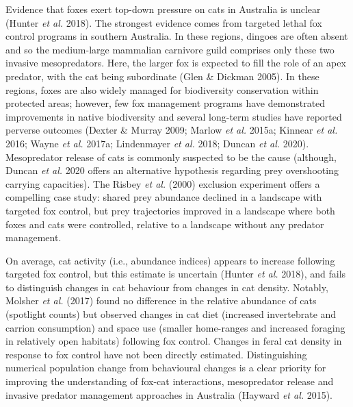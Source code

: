 \documentclass[11pt,a4paper,titlepage,twoside,openright]{style/unimelbthesis}
\begin{document}
\begin{mainmatter}
Evidence that foxes exert top-down pressure on cats in Australia is unclear (Hunter \emph{et al.} 2018). The strongest evidence comes from targeted lethal fox control programs in southern Australia. In these regions, dingoes are often absent and so the medium-large mammalian carnivore guild comprises only these two invasive mesopredators. Here, the larger fox is expected to fill the role of an apex predator, with the cat being subordinate (Glen \& Dickman 2005). In these regions, foxes are also widely managed for biodiversity conservation within protected areas; however, few fox management programs have demonstrated improvements in native biodiversity and several long-term studies have reported perverse outcomes (Dexter \& Murray 2009; Marlow \emph{et al.} 2015a; Kinnear \emph{et al.} 2016; Wayne \emph{et al.} 2017a; Lindenmayer \emph{et al.} 2018; Duncan \emph{et al.} 2020). Mesopredator release of cats is commonly suspected to be the cause (although, Duncan \emph{et al.} 2020 offers an alternative hypothesis regarding prey overshooting carrying capacities). The Risbey \emph{et al.} (2000) exclusion experiment offers a compelling case study: shared prey abundance declined in a landscape with targeted fox control, but prey trajectories improved in a landscape where both foxes and cats were controlled, relative to a landscape without any predator management.

On average, cat activity (i.e., abundance indices) appears to increase following targeted fox control, but this estimate is uncertain (Hunter \emph{et al.} 2018), and fails to distinguish changes in cat behaviour from changes in cat density. Notably, Molsher \emph{et al.} (2017) found no difference in the relative abundance of cats (spotlight counts) but observed changes in cat diet (increased invertebrate and carrion consumption) and space use (smaller home-ranges and increased foraging in relatively open habitats) following fox control. Changes in feral cat density in response to fox control have not been directly estimated. Distinguishing numerical population change from behavioural changes is a clear priority for improving the understanding of fox-cat interactions, mesopredator release and invasive predator management approaches in Australia (Hayward \emph{et al.} 2015).


\end{mainmatter}
\end{document}
